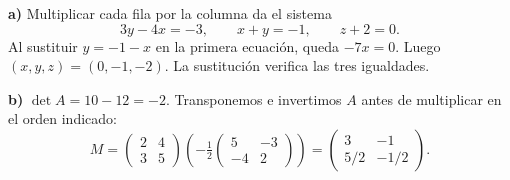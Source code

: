 \textbf{a)} Multiplicar cada fila por la columna da el sistema
\[
3y-4x=-3,\qquad x+y=-1,\qquad z+2=0.
\]
Al sustituir $y=-1-x$ en la primera ecuación, queda $-7x=0$. Luego $\boxed{(x,y,z)=(0,-1,-2)}$. La sustitución verifica las tres igualdades.

\textbf{b)} $\det A=10-12=-2$. Transponemos e invertimos $A$ antes de multiplicar en el orden indicado:
\[
M=\begin{pmatrix}2&4\\3&5\end{pmatrix}
\left(-\tfrac12\begin{pmatrix}5&-3\\-4&2\end{pmatrix}\right)
=\boxed{\begin{pmatrix}3&-1\\5/2&-1/2\end{pmatrix}}.
\]
